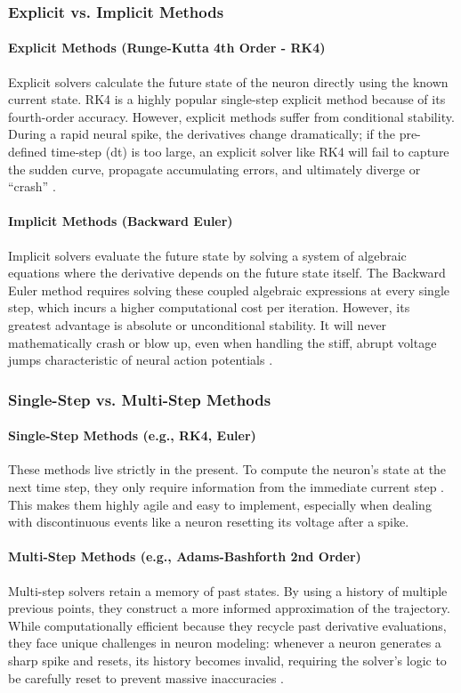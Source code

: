 \documentclass[conference]{IEEEtran}
\begin{document}
\subsubsection{Explicit vs. Implicit Methods}
\paragraph{Explicit Methods (Runge-Kutta 4th Order - RK4)}
Explicit solvers calculate the future state of the neuron directly using the known current state. RK4 is a highly popular single-step explicit method because of its fourth-order accuracy. However, explicit methods suffer from conditional stability. During a rapid neural spike, the derivatives change dramatically; if the pre-defined time-step (dt) is too large, an explicit solver like RK4 will fail to capture the sudden curve, propagate accumulating errors, and ultimately diverge or ``crash'' \cite{sanyal}.

\paragraph{Implicit Methods (Backward Euler)}
Implicit solvers evaluate the future state by solving a system of algebraic equations where the derivative depends on the future state itself. The Backward Euler method requires solving these coupled algebraic expressions at every single step, which incurs a higher computational cost per iteration. However, its greatest advantage is absolute or unconditional stability. It will never mathematically crash or blow up, even when handling the stiff, abrupt voltage jumps characteristic of neural action potentials \cite{sanyal}.

\subsubsection{Single-Step vs. Multi-Step Methods}
\paragraph{Single-Step Methods (e.g., RK4, Euler)}
These methods live strictly in the present. To compute the neuron's state at the next time step, they only require information from the immediate current step \cite{sanyal}. This makes them highly agile and easy to implement, especially when dealing with discontinuous events like a neuron resetting its voltage after a spike.

\paragraph{Multi-Step Methods (e.g., Adams-Bashforth 2nd Order)}
Multi-step solvers retain a memory of past states. By using a history of multiple previous points, they construct a more informed approximation of the trajectory. While computationally efficient because they recycle past derivative evaluations, they face unique challenges in neuron modeling: whenever a neuron generates a sharp spike and resets, its history becomes invalid, requiring the solver's logic to be carefully reset to prevent massive inaccuracies \cite{sanyal}.
\end{document}
